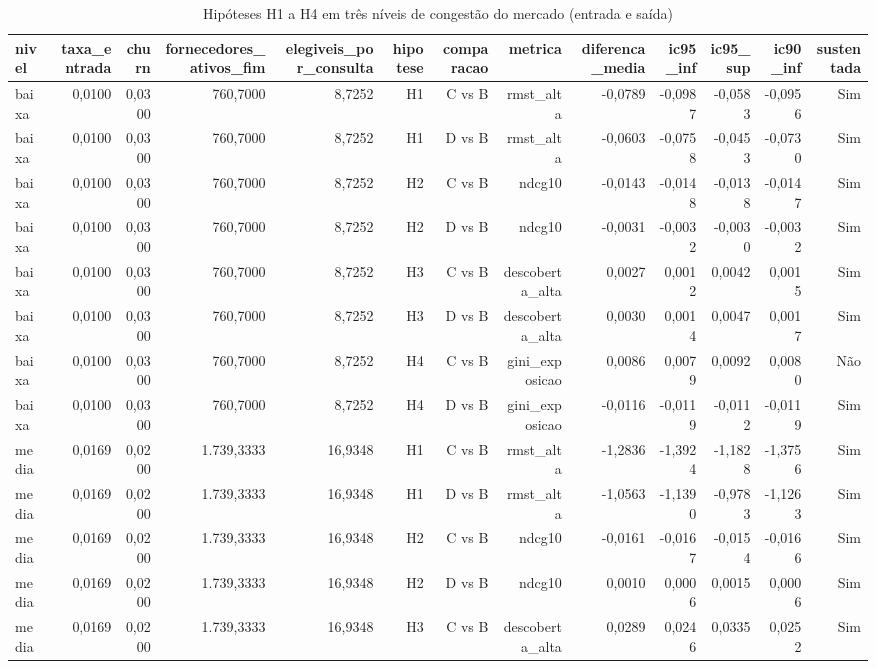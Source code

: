 \begin{table}[ht]
\centering
\caption{Hipóteses H1 a H4 em três níveis de congestão do mercado (entrada e saída)}
\label{tab:congestao}
\begin{tabular}{lrrrrrrrrrrrr}
\hline
\textbf{nivel} & \textbf{taxa\_entrada} & \textbf{churn} & \textbf{fornecedores\_ativos\_fim} & \textbf{elegiveis\_por\_consulta} & \textbf{hipotese} & \textbf{comparacao} & \textbf{metrica} & \textbf{diferenca\_media} & \textbf{ic95\_inf} & \textbf{ic95\_sup} & \textbf{ic90\_inf} & \textbf{sustentada} \\
\hline
baixa & 0,0100 & 0,0300 & 760,7000 & 8,7252 & H1 & C vs B & rmst\_alta & -0,0789 & -0,0987 & -0,0583 & -0,0956 & Sim \\
baixa & 0,0100 & 0,0300 & 760,7000 & 8,7252 & H1 & D vs B & rmst\_alta & -0,0603 & -0,0758 & -0,0453 & -0,0730 & Sim \\
baixa & 0,0100 & 0,0300 & 760,7000 & 8,7252 & H2 & C vs B & ndcg10 & -0,0143 & -0,0148 & -0,0138 & -0,0147 & Sim \\
baixa & 0,0100 & 0,0300 & 760,7000 & 8,7252 & H2 & D vs B & ndcg10 & -0,0031 & -0,0032 & -0,0030 & -0,0032 & Sim \\
baixa & 0,0100 & 0,0300 & 760,7000 & 8,7252 & H3 & C vs B & descoberta\_alta & 0,0027 & 0,0012 & 0,0042 & 0,0015 & Sim \\
baixa & 0,0100 & 0,0300 & 760,7000 & 8,7252 & H3 & D vs B & descoberta\_alta & 0,0030 & 0,0014 & 0,0047 & 0,0017 & Sim \\
baixa & 0,0100 & 0,0300 & 760,7000 & 8,7252 & H4 & C vs B & gini\_exposicao & 0,0086 & 0,0079 & 0,0092 & 0,0080 & Não \\
baixa & 0,0100 & 0,0300 & 760,7000 & 8,7252 & H4 & D vs B & gini\_exposicao & -0,0116 & -0,0119 & -0,0112 & -0,0119 & Sim \\
media & 0,0169 & 0,0200 & 1.739,3333 & 16,9348 & H1 & C vs B & rmst\_alta & -1,2836 & -1,3924 & -1,1828 & -1,3756 & Sim \\
media & 0,0169 & 0,0200 & 1.739,3333 & 16,9348 & H1 & D vs B & rmst\_alta & -1,0563 & -1,1390 & -0,9783 & -1,1263 & Sim \\
media & 0,0169 & 0,0200 & 1.739,3333 & 16,9348 & H2 & C vs B & ndcg10 & -0,0161 & -0,0167 & -0,0154 & -0,0166 & Sim \\
media & 0,0169 & 0,0200 & 1.739,3333 & 16,9348 & H2 & D vs B & ndcg10 & 0,0010 & 0,0006 & 0,0015 & 0,0006 & Sim \\
media & 0,0169 & 0,0200 & 1.739,3333 & 16,9348 & H3 & C vs B & descoberta\_alta & 0,0289 & 0,0246 & 0,0335 & 0,0252 & Sim \\

\end{tabular}
\end{table}
